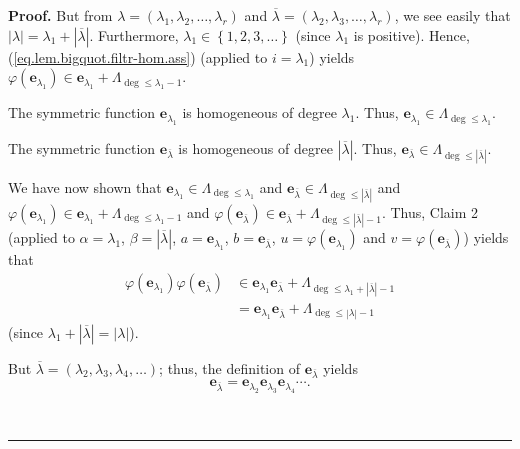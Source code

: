 \documentclass[numbers=enddot,12pt,final,onecolumn,notitlepage]{scrartcl}%
\theoremstyle{definition}
\newenvironment{proof}[1][Proof]{\noindent\textbf{#1.} }{\ \rule{0.5em}{0.5em}}
\begin{document}
\begin{proof}
But from $\lambda=\left(  \lambda_{1},\lambda_{2},\ldots,\lambda_{r}\right)  $
and $\overline{\lambda}=\left(  \lambda_{2},\lambda_{3},\ldots,\lambda
_{r}\right)  $, we see easily that $\left\vert \lambda\right\vert =\lambda
_{1}+\left\vert \overline{\lambda}\right\vert $. Furthermore, $\lambda_{1}%
\in\left\{  1,2,3,\ldots\right\}  $ (since $\lambda_{1}$ is positive). Hence,
(\ref{eq.lem.bigquot.filtr-hom.ass}) (applied to $i=\lambda_{1}$) yields
$\varphi\left(  \mathbf{e}_{\lambda_{1}}\right)  \in\mathbf{e}_{\lambda_{1}%
}+\Lambda_{\deg\leq\lambda_{1}-1}$.

The symmetric function $\mathbf{e}_{\lambda_{1}}$ is homogeneous of degree
$\lambda_{1}$. Thus, $\mathbf{e}_{\lambda_{1}}\in\Lambda_{\deg\leq\lambda_{1}%
}$.

The symmetric function $\mathbf{e}_{\overline{\lambda}}$ is homogeneous of
degree $\left\vert \overline{\lambda}\right\vert $. Thus, $\mathbf{e}%
_{\overline{\lambda}}\in\Lambda_{\deg\leq\left\vert \overline{\lambda
}\right\vert }$.

We have now shown that $\mathbf{e}_{\lambda_{1}}\in\Lambda_{\deg\leq
\lambda_{1}}$ and $\mathbf{e}_{\overline{\lambda}}\in\Lambda_{\deg
\leq\left\vert \overline{\lambda}\right\vert }$ and $\varphi\left(
\mathbf{e}_{\lambda_{1}}\right)  \in\mathbf{e}_{\lambda_{1}}+\Lambda_{\deg
\leq\lambda_{1}-1}$ and $\varphi\left(  \mathbf{e}_{\overline{\lambda}%
}\right)  \in\mathbf{e}_{\overline{\lambda}}+\Lambda_{\deg\leq\left\vert
\overline{\lambda}\right\vert -1}$. Thus, Claim 2 (applied to $\alpha
=\lambda_{1}$, $\beta=\left\vert \overline{\lambda}\right\vert $,
$a=\mathbf{e}_{\lambda_{1}}$, $b=\mathbf{e}_{\overline{\lambda}}$,
$u=\varphi\left(  \mathbf{e}_{\lambda_{1}}\right)  $ and $v=\varphi\left(
\mathbf{e}_{\overline{\lambda}}\right)  $) yields that%
\begin{align}
\varphi\left(  \mathbf{e}_{\lambda_{1}}\right)  \varphi\left(  \mathbf{e}%
_{\overline{\lambda}}\right)   &  \in\mathbf{e}_{\lambda_{1}}\mathbf{e}%
_{\overline{\lambda}}+\Lambda_{\deg\leq\lambda_{1}+\left\vert \overline
{\lambda}\right\vert -1}\nonumber\\
&  =\mathbf{e}_{\lambda_{1}}\mathbf{e}_{\overline{\lambda}}+\Lambda_{\deg
\leq\left\vert \lambda\right\vert -1} \label{pf.lem.bigquot.filtr-hom.2}%
\end{align}
(since $\lambda_{1}+\left\vert \overline{\lambda}\right\vert =\left\vert
\lambda\right\vert $).

But $\overline{\lambda}=\left(  \lambda_{2},\lambda_{3},\lambda_{4}%
,\ldots\right)  $; thus, the definition of $\mathbf{e}_{\overline{\lambda}}$
yields%
\begin{equation}
\mathbf{e}_{\overline{\lambda}}=\mathbf{e}_{\lambda_{2}}\mathbf{e}%
_{\lambda_{3}}\mathbf{e}_{\lambda_{4}}\cdots.
\label{pf.lem.bigquot.filtr-hom.3}%
\end{equation}



\end{proof}
\end{document}
